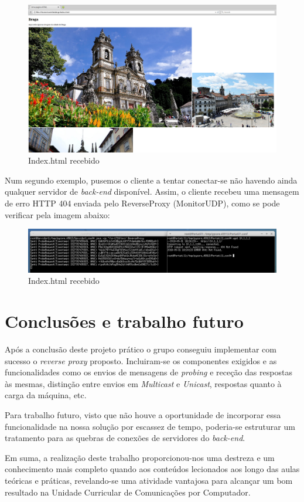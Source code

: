 \documentclass{article}
\begin{document}
\begin{figure}[H]
    \centering
    \includegraphics[scale=0.2]{img/site.png}
    \caption{Index.html recebido}
\end{figure}

\newpage
Num segundo exemplo, pusemos o cliente a tentar conectar-se não havendo ainda qualquer servidor de \emph{back-end} disponível. Assim, o cliente recebeu uma mensagem de erro HTTP 404 enviada pelo ReverseProxy (MonitorUDP), como se pode verificar pela imagem abaixo:

\begin{figure}[H]
    \centering
    \includegraphics[scale=0.4]{img/noservers.png}
    \caption{Index.html recebido}
\end{figure}

\newpage

\section{Conclusões e trabalho futuro}

Após a conclusão deste projeto prático o grupo conseguiu implementar com sucesso o \emph{reverse proxy} proposto. Incluiram-se os componentes exigidos e as funcionalidades como os envios de mensagens de \emph{probing} e receção das respostas às mesmas, distinção entre envios em \emph{Multicast} e \emph{Unicast}, respostas quanto à carga da máquina, etc. 

Para trabalho futuro, visto que não houve a oportunidade de incorporar essa funcionalidade na nossa solução por escassez de tempo, poderia-se estruturar um tratamento para as quebras de conexões de servidores do \emph{back-end}.

Em suma, a realização deste trabalho proporcionou-nos uma destreza e um conhecimento mais completo quando aos conteúdos lecionados aos longo das aulas teóricas e práticas, revelando-se uma atividade vantajosa para alcançar um bom resultado na Unidade Curricular de Comunicações por Computador.
\end{document}
